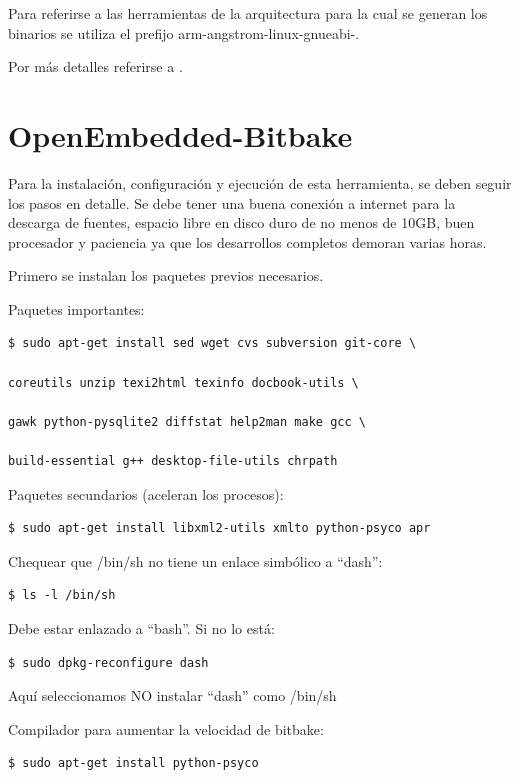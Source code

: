 Para referirse a las herramientas de la arquitectura para la cual se generan los binarios se utiliza el prefijo arm-angstrom-linux-gnueabi-.

\bigskip
Por más detalles referirse a \cite{conf_SDK}.


\section{OpenEmbedded-Bitbake}\label{anx_sw_oe}

Para la instalación, configuración y ejecución de esta herramienta, se deben seguir los pasos en detalle. Se debe tener una buena conexión a internet para la descarga de fuentes, espacio libre en disco duro de no menos de 10GB, buen procesador y paciencia ya que los desarrollos completos demoran varias horas.

\bigskip
Primero se instalan los paquetes previos necesarios. 

\newpage
Paquetes importantes:

\begin{verbatim}
$ sudo apt-get install sed wget cvs subversion git-core \

coreutils unzip texi2html texinfo docbook-utils \

gawk python-pysqlite2 diffstat help2man make gcc \

build-essential g++ desktop-file-utils chrpath
\end{verbatim}

Paquetes secundarios (aceleran los procesos):

\begin{verbatim}
$ sudo apt-get install libxml2-utils xmlto python-psyco apr
\end{verbatim}

Chequear que /bin/sh no tiene un enlace simbólico a “dash”:

\begin{verbatim}
$ ls -l /bin/sh
\end{verbatim}

Debe estar enlazado a “bash”. Si no lo está:

\begin{verbatim}
$ sudo dpkg-reconfigure dash
\end{verbatim}

Aquí seleccionamos NO instalar “dash” como /bin/sh

\bigskip
Compilador para aumentar la velocidad de bitbake:

\begin{verbatim}
$ sudo apt-get install python-psyco
\end{verbatim}

